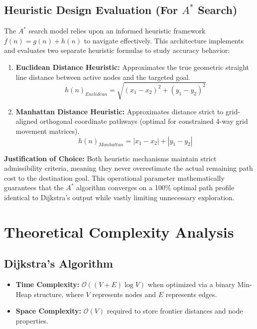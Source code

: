 \documentclass[11pt,a4paper]{article}
\begin{document}
\subsection{Heuristic Design Evaluation (For $A^*$ Search)}
The $A^*$ search model relies upon an informed heuristic framework $f(n) = g(n) + h(n)$ to navigate effectively. This architecture implements and evaluates two separate heuristic formulas to study accuracy behavior:
\begin{enumerate}
    \item \textbf{Euclidean Distance Heuristic:} Approximates the true geometric straight line distance between active nodes and the targeted goal.
    \[ h(n)_{Euclidean} = \sqrt{(x_1 - x_2)^2 + (y_1 - y_2)^2} \]
    \item \textbf{Manhattan Distance Heuristic:} Approximates distance strict to grid-aligned orthogonal coordinate pathways (optimal for constrained 4-way grid movement matrices).
    \[ h(n)_{Manhattan} = |x_1 - x_2| + |y_1 - y_2| \]
\end{enumerate}
\textbf{Justification of Choice:} Both heuristic mechanisms maintain strict admissibility criteria, meaning they never overestimate the actual remaining path cost to the destination goal. This operational parameter mathematically guarantees that the $A^*$ algorithm converges on a 100\% optimal path profile identical to Dijkstra's output while vastly limiting unnecessary exploration.

\section{Theoretical Complexity Analysis}
\subsection{Dijkstra's Algorithm}
\begin{itemize}
    \item \textbf{Time Complexity:} $\mathcal{O}((V + E) \log V)$ when optimized via a binary Min-Heap structure, where $V$ represents nodes and $E$ represents edges.
    \item \textbf{Space Complexity:} $\mathcal{O}(V)$ required to store frontier distances and node properties.
\end{itemize}
\end{document}
